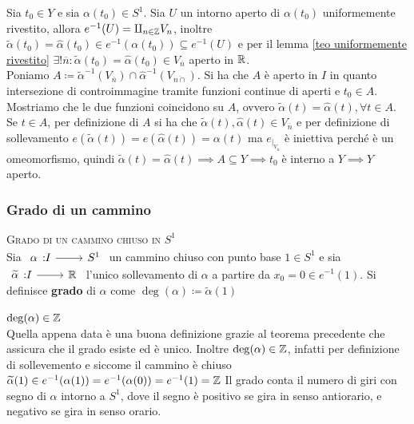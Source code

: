 \begin{demonstration}
	Sia $t_0\in Y$ e sia $\alpha(t_0)\in S^1$. Sia $U$ un intorno aperto di $\alpha(t_0)$ uniformemente rivestito, allora $e^{-1}(U)=\amalg_{n\in\mathbb{Z}}V_n$, inoltre $\widetilde{\alpha}(t_0)=\widehat{\alpha}(t_0)\in e^{-1} \left( \alpha(t_0) \right)\subseteq e^{-1}(U)$ e per il lemma \ref{teo uniformemente rivestito} $\exists ! \overline{n} \colon \widetilde{\alpha} (t_0)=\widehat{\alpha}(t_0)\in V_{\overline{n}}$ aperto in $\mathbb{R}$. \\
	Poniamo $A\coloneqq \widetilde{\alpha}^{-1}(V_{\overline{n}}) \cap \widehat{\alpha}^{-1}(V_{\overline{n\cap }})$. Si ha che $A$ è aperto in $I$ in quanto intersezione di controimmagine tramite funzioni continue di aperti e $t_0 \in A$. Mostriamo che le due funzioni coincidono su $A$, ovvero $\widetilde{\alpha}(t)=\widehat{\alpha}(t), \forall t\in A$. Se $t\in A$, per definizione di $A$ si ha che $\widetilde{\alpha}(t), \widehat{\alpha}(t)\in V_{\overline{n}}$ e per definizione di sollevamento $e\left( \widetilde{\alpha}(t) \right)= e\left( \widehat{\alpha}(t) \right)= \alpha(t)$ ma $e_{|_{V_{\overline{n}}}}$ è iniettiva perché è un omeomorfismo, quindi $\widetilde{\alpha}(t)=\widehat{\alpha}(t) \implies A\subseteq Y \implies t_0$ è interno a $Y \implies Y$ aperto.
\end{demonstration}

\subsubsection{Grado di un cammino}
\begin{define} \textsc{Grado di un cammino chiuso in $S^1$}\\
	Sia $\funz \alpha I {S^1}$ un cammino chiuso con punto base $1\in S^1$ e sia $\funz {\widetilde{\alpha}} I \realset$ l'unico sollevamento di $\alpha$ a partire da $x_0=0 \in e^{-1} (1)$. Si definisce \textbf{grado} di $\alpha$ come $\deg (\alpha)\coloneqq \widetilde{\alpha}(1)$
\end{define}

\begin{observe} \textsc{$\deg(\alpha)\in\mathbb{Z}$}\\
	Quella appena data è una buona definizione grazie al teorema precedente che assicura che il grado esiste ed è unico. \newline
	Inoltre $\deg(\alpha)\in\mathbb{Z}$, infatti per definizione di sollevemento e siccome il cammino è chiuso $\widetilde{\alpha}(1)\in e^{-1}(\alpha(1))=e^{-1}(\alpha(0))=e^{-1}(1)=\mathbb{Z}$\newline
	Il grado conta il numero di giri con segno di $\alpha$ intorno a $S^1$, dove il segno è positivo se gira in senso antiorario, e negativo se gira in senso orario.
\end{observe}

